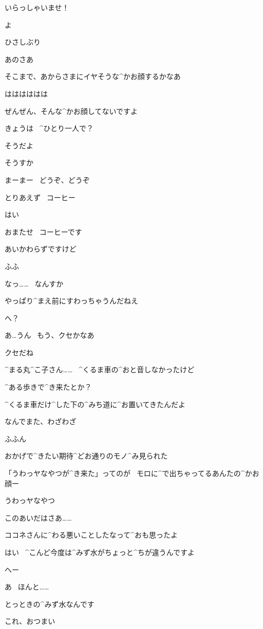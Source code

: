 \page[103]
\A いらっしゃいませ！

\page
\R よ

\A ひさしぶり

\R あのさあ

\R そこまで、あからさまにイヤそうな^{かお}{顔}するかなあ

\A はははははは

\A ぜんぜん、そんな^{かお}{顔}してないですよ

\page
\A きょうは
\ ^{ひとり}{一人}で？

\R そうだよ

\A そうすか

\A まーまー
\ どうぞ、どうぞ

\R とりあえず
\ コーヒー

\A はい

\page[107]
\A おまたせ
\ コーヒーです

\A あいかわらずですけど

\page
\R ふふ

\A なっ……
\ なんすか

\R やっぱり^{まえ}{前}にすわっちゃうんだねえ

\A へ？

\A あ…うん
\ もう、クセかなあ

\R クセだね

\page
\A ^{まる}{丸}^{こ}{子}さん……
\ ^{くるま}{車}の^{おと}{音}しなかったけど

\A ^{ある}{歩}きで^{き}{来}たとか？

\R ^{くるま}{車}だけ^{した}{下}の^{みち}{道}に^{お}{置}いてきたんだよ

\A なんでまた、わざわざ

\R ふふん

\R おかげで^{きたい}{期待}^{どお}{通}りのモノ^{み}{見}られた

\R 「うわっヤなやつが^{き}{来}た」ってのが
\ モロに^{で}{出}ちゃってるあんたの^{かお}{顔}ー

\A うわっヤなやつ

\page
\R このあいだはさあ……

\R ココネさんに^{わる}{悪}いことしたなって^{おも}{思}ったよ

\page
\A はい
\ ^{こんど}{今度}は^{みず}{水}がちょっと^{ちが}{違}うんですよ

\R へー

\R あ
\ ほんと……

\A とっときの^{みず}{水}なんです

\A これ、おつまい

